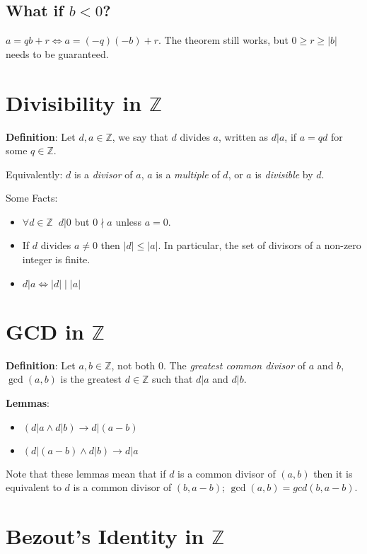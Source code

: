 \documentclass{article}
\begin{document}
\begin{multicols*}{2}
\subsection{What if $b < 0$?}

$a = qb + r \Leftrightarrow a = (-q)(-b) + r$. The theorem still works, but $0 \geq r \geq |b|$ needs to be guaranteed.

\section {Divisibility in $\mathbb{Z}$}

\textbf{Definition}: Let $d, a \in \mathbb{Z}$, we say that $d$ divides $a$, written as $d | a$, if $a = qd$ for some $q \in \mathbb{Z}$.

Equivalently: $d$ is a \textit{divisor} of $a$, $a$ is a \textit{multiple} of $d$, or $a$ is \textit{divisible} by $d$.

Some Facts:
\begin{itemize}
    \item $\forall d \in \mathbb{Z}\;\;d | 0$ but $0 \nmid a$ unless $a = 0$.
    \item If $d$ divides $a \neq 0$ then $|d| \leq |a|$. In particular, the set of divisors of a non-zero integer is finite.
    \item $d|a \Leftrightarrow |d| \;|\; |a|$
\end{itemize}

\section {GCD in $\mathbb{Z}$}

\textbf{Definition}: Let $a, b \in \mathbb{Z}$, not both 0. The \textit{greatest common divisor} of $a$ and $b$, $\gcd(a, b)$ is the greatest $d \in \mathbb{Z}$ such that $d | a$ and $d | b$.

\textbf{Lemmas}:
\begin{itemize}
    \item $( d | a \land d | b )\rightarrow d|(a-b)$
    \item $( d | (a-b) \land d | b )\rightarrow d|a$
\end{itemize}

Note that these lemmas mean that if $d$ is a common divisor of $(a, b)$ then it is equivalent to $d$ is a common divisor of $(b, a-b)$; $\gcd(a, b) = gcd(b, a- b)$.

\section{Bezout's Identity in $\mathbb{Z}$}


\end{multicols*}
\end{document}
